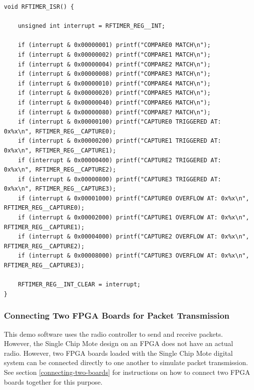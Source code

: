 \begin{lstlisting}
void RFTIMER_ISR() {

    unsigned int interrupt = RFTIMER_REG__INT;

    if (interrupt & 0x00000001) printf("COMPARE0 MATCH\n");
    if (interrupt & 0x00000002) printf("COMPARE1 MATCH\n");
    if (interrupt & 0x00000004) printf("COMPARE2 MATCH\n");
    if (interrupt & 0x00000008) printf("COMPARE3 MATCH\n");
    if (interrupt & 0x00000010) printf("COMPARE4 MATCH\n");
    if (interrupt & 0x00000020) printf("COMPARE5 MATCH\n");
    if (interrupt & 0x00000040) printf("COMPARE6 MATCH\n");
    if (interrupt & 0x00000080) printf("COMPARE7 MATCH\n");
    if (interrupt & 0x00000100) printf("CAPTURE0 TRIGGERED AT: 0x%x\n", RFTIMER_REG__CAPTURE0);
    if (interrupt & 0x00000200) printf("CAPTURE1 TRIGGERED AT: 0x%x\n", RFTIMER_REG__CAPTURE1);
    if (interrupt & 0x00000400) printf("CAPTURE2 TRIGGERED AT: 0x%x\n", RFTIMER_REG__CAPTURE2);
    if (interrupt & 0x00000800) printf("CAPTURE3 TRIGGERED AT: 0x%x\n", RFTIMER_REG__CAPTURE3);
    if (interrupt & 0x00001000) printf("CAPTURE0 OVERFLOW AT: 0x%x\n", RFTIMER_REG__CAPTURE0);
    if (interrupt & 0x00002000) printf("CAPTURE1 OVERFLOW AT: 0x%x\n", RFTIMER_REG__CAPTURE1);
    if (interrupt & 0x00004000) printf("CAPTURE2 OVERFLOW AT: 0x%x\n", RFTIMER_REG__CAPTURE2);
    if (interrupt & 0x00008000) printf("CAPTURE3 OVERFLOW AT: 0x%x\n", RFTIMER_REG__CAPTURE3);

    RFTIMER_REG__INT_CLEAR = interrupt;
}
\end{lstlisting}

\subsubsection{Connecting Two FPGA Boards for Packet Transmission}
This demo software uses the radio controller to send and receive packets. However, the Single Chip Mote design on an FPGA does not have an actual radio. However, two FPGA boards loaded with the Single Chip Mote digital system can be connected directly to one another to simulate packet transmission. See section \ref{connecting-two-boards} for instructions on how to connect two FPGA boards together for this purpose. 